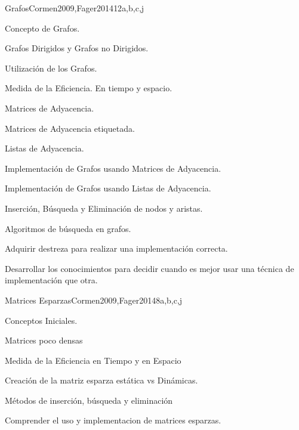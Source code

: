 \begin{syllabus}
\begin{unit}{Grafos}{}{Cormen2009,Fager2014}{12}{a,b,c,j}
   \begin{topics}
    \item Concepto de Grafos.
    \item Grafos Dirigidos y Grafos no Dirigidos.
    \item Utilización de los Grafos.
    \item Medida de la Eficiencia. En tiempo y espacio.
    \item Matrices de Adyacencia.
    \item Matrices de Adyacencia etiquetada.
    \item Listas de Adyacencia.
    \item Implementación de Grafos usando Matrices de Adyacencia.
    \item Implementación de Grafos usando Listas de Adyacencia.
    \item Inserción, Búsqueda y Eliminación de nodos y aristas.
    \item Algoritmos de búsqueda en grafos.
   \end{topics}
   \begin{learningoutcomes}
      \item  Adquirir destreza para realizar una implementación correcta.
      \item  Desarrollar los conocimientos para decidir cuando es mejor usar una técnica de implementación que otra.
   \end{learningoutcomes}
\end{unit}

\begin{unit}{Matrices Esparzas}{}{Cormen2009,Fager2014}{8}{a,b,c,j}
   \begin{topics}
    \item  Conceptos  Iniciales.
    \item  Matrices poco densas
    \item  Medida de la Eficiencia en Tiempo  y en Espacio
    \item  Creación de la matriz esparza estática vs Dinámicas.
    \item  Métodos de inserción, búsqueda y eliminación
   \end{topics}

\begin{learningoutcomes}
      \item Comprender el uso y implementacion de matrices esparzas.
   \end{learningoutcomes}
\end{unit}


\end{syllabus}
